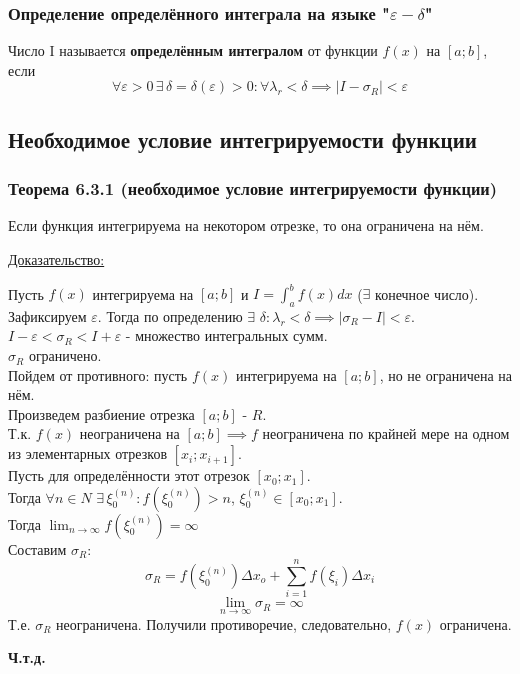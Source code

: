 \documentclass[12pt]{article}
\begin{document}
    \subsubsection*{Определение определённого интеграла на языке "$\varepsilon - \delta$"}\noindent
    Число I называется \textbf{определённым интегралом} от функции $f(x)$
    на $[a;b]$, если 
    \[\forall \varepsilon>0 \,\exists\, \delta = \delta(\varepsilon)>0: 
    \forall \lambda_r < \delta \implies |I-\sigma_R | <\varepsilon\]

    \subsection{Необходимое условие интегрируемости функции}
    \subsubsection*{Теорема 6.3.1 (необходимое условие интегрируемости функции)}\label{th:6.3.1}
    Если функция интегрируема на некотором отрезке, то она ограничена на нём.\par\noindent
    \underline{Доказательство:}
    \begin{adjustwidth}{1.5em}{1.5em}
        Пусть $f(x)$ интегрируема на $[a;b]$ и $I = \int_{a}^{b} f(x)dx$ ($\exists$ конечное число).\\
        Зафиксируем $\varepsilon$. Тогда по определению $\exists$ $\delta: \lambda_r < \delta \implies |\sigma_R - I| < \varepsilon$.\\
        $I-\varepsilon < \sigma_R < I+\varepsilon$ - множество интегральных сумм.\\
        $\sigma_R$ ограничено.\\
        Пойдем от противного: пусть $f(x)$ интегрируема на $[a;b]$, но не ограничена на нём.\\
        Произведем разбиение отрезка $[a;b]$ - $R$.\\
        Т.к. $f(x)$ неограничена на $[a;b] \implies f$ неограничена по крайней мере на одном из элементарных отрезков $[x_i;x_{i+1}]$.\\
        Пусть для определённости этот отрезок $[x_0;x_1]$.\\
        Тогда $\forall n \in N \,\,\exists \,\xi^{(n)}_0: f(\xi^{(n)}_0)>n$, $\xi^{(n)}_0 \in [x_0;x_1]$.\\
        Тогда $\lim_{n \to \infty} f(\xi^{(n)}_0) = \infty$\\
        Составим $\sigma_R$:
        \[ \sigma_R = f(\xi^{(n)}_0) \Delta x_o + \sum_{i=1}^{n} f(\xi_i) \Delta x_i \]
        \[ \lim_{n \to \infty} \sigma_R = \infty \]
        Т.е. $\sigma_R$ неограничена. Получили противоречие, следовательно, $f(x)$ ограничена.
        \begin{center}
            \textbf{Ч.т.д.}
        \end{center}
    \end{adjustwidth}\noindent
\end{document}
